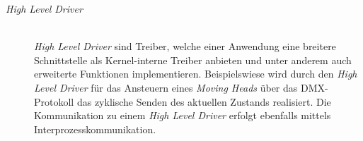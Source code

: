 \begin{description}
	\item[\textit{High Level Driver}] \hfill \\
	\textit{High Level Driver} sind Treiber, welche einer Anwendung eine breitere Schnittstelle als Kernel-interne Treiber anbieten und unter anderem auch erweiterte Funktionen implementieren. Beispielswiese wird durch den \textit{High Level Driver} für das Ansteuern eines \textit{Moving Heads} über das \ac{DMX}-Protokoll das zyklische Senden des aktuellen Zustands realisiert. Die Kommunikation zu einem \textit{High Level Driver} erfolgt ebenfalls mittels Interprozesskommunikation. 
\end{description}

\pagebreak 